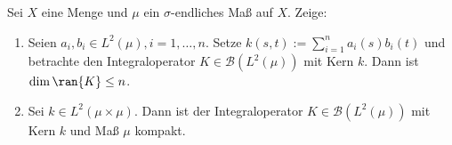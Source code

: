 \begin{exercise}[IO/2]

Sei $X$ eine Menge und $\mu$ ein $\sigma$-endliches Maß auf $X$.
Zeige:

\begin{enumerate}[label = (\alph*)]

  \item
  Seien $a_i, b_i \in L^2(\mu), i = 1, \ldots, n$.
  Setze $k(s, t) := \sum_{i=1}^n a_i(s) b_i(t)$ und betrachte den Integraloperator $K \in \mathcal{B}(L^2(\mu))$ mit Kern $k$.
  Dann ist $\dim{\ran{K}} \leq n$.

  \item
  Sei $k \in L^2(\mu \times \mu)$.
  Dann ist der Integraloperator $K \in \mathcal{B}(L^2(\mu))$ mit Kern $k$ und Maß $\mu$ kompakt.

\end{enumerate}

\end{exercise}

